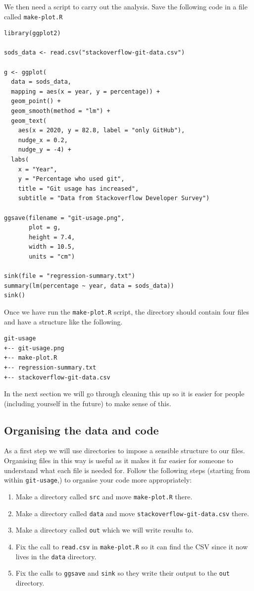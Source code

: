 \documentclass[11pt,onecolumn]{scrartcl}
\begin{document}
We then need a script to carry out the analysis. Save the following code in a
file called \texttt{make-plot.R}

\lstset{language=r,label= ,caption= ,captionpos=b,numbers=none}
\begin{lstlisting}
library(ggplot2)

sods_data <- read.csv("stackoverflow-git-data.csv")

g <- ggplot(
  data = sods_data,
  mapping = aes(x = year, y = percentage)) +
  geom_point() +
  geom_smooth(method = "lm") +
  geom_text(
    aes(x = 2020, y = 82.8, label = "only GitHub"),
    nudge_x = 0.2,
    nudge_y = -4) +
  labs(
    x = "Year",
    y = "Percentage who used git",
    title = "Git usage has increased",
    subtitle = "Data from Stackoverflow Developer Survey")

ggsave(filename = "git-usage.png",
       plot = g,
       height = 7.4,
       width = 10.5,
       units = "cm")

sink(file = "regression-summary.txt")
summary(lm(percentage ~ year, data = sods_data))
sink()
\end{lstlisting}

Once we have run the \texttt{make-plot.R} script, the directory should contain four files
and have a structure like the following.

\begin{verbatim}
git-usage
+-- git-usage.png
+-- make-plot.R
+-- regression-summary.txt
+-- stackoverflow-git-data.csv
\end{verbatim}

In the next section we will go through cleaning this up so it is easier for
people (including yourself in the future) to make sense of this.

\subsection{Organising the data and code}
\label{sec:orgd51b455}

As a first step we will use directories to impose a sensible structure to our
files. Organising files in this way is useful as it makes it far easier for
someone to understand what each file is needed for. Follow the following steps
(starting from within \texttt{git-usage},) to organise your code more appropriately:

\begin{enumerate}
\item Make a directory called \texttt{src} and move \texttt{make-plot.R} there.
\item Make a directory called \texttt{data} and move \texttt{stackoverflow-git-data.csv} there.
\item Make a directory called \texttt{out} which we will write results to.
\item Fix the call to \texttt{read.csv} in \texttt{make-plot.R} so it can find the CSV since it
now lives in the \texttt{data} directory.
\item Fix the calls to \texttt{ggsave} and \texttt{sink} so they write their output to the \texttt{out}
directory.
\end{enumerate}
\end{document}
